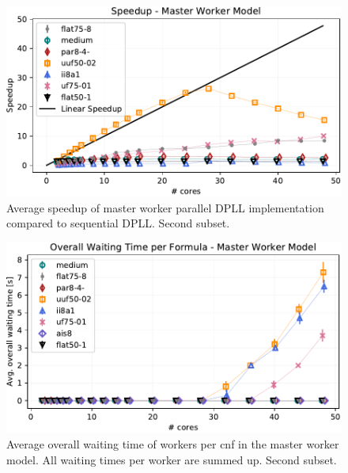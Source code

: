 \documentclass[letterpaper]{article}
\begin{document}
\begin{figure}[p]
    \centering
    \includegraphics[width=\columnwidth]{figures/scaling_parallel_non_subset_dpll_scaling_tar.pdf}
    \caption{Average speedup of master worker parallel DPLL implementation compared to sequential DPLL.
    Second subset.}
    \label{fig:dpll_parallel_speedup_non}
\end{figure}

\begin{figure}[p]
    \centering
    \includegraphics[width=\columnwidth]{figures/waiting_parallel_non_subset_dpll_scaling_tar.pdf}
    \caption{Average overall waiting time of workers per cnf in the master worker model.
    All waiting times per worker are summed up.
    Second subset.}
    \label{fig:dpll_parallel_waiting_non}
\end{figure}
\end{document}
